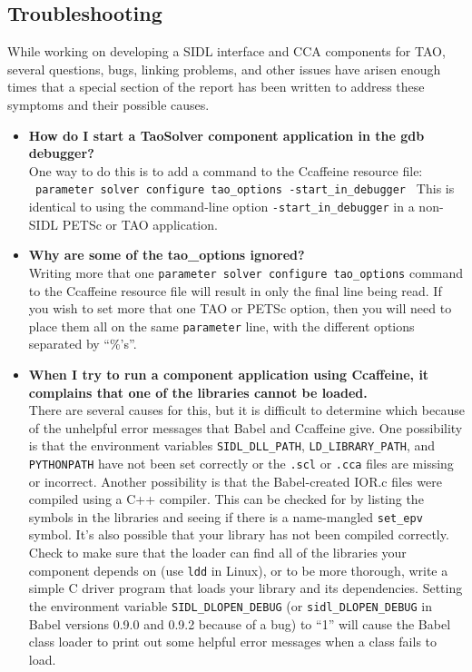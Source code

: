 \documentclass[doublespacing,12pt]{article}
\begin{document}
\subsection{Troubleshooting}
While working on developing a SIDL interface and CCA components for
TAO, several questions, bugs, linking problems, and other issues have arisen
enough times that a special section of the report has been written to
address these symptoms and their possible causes.
\begin{itemize}
\item \textbf{How do I start a TaoSolver component application in the
  gdb debugger?}\\
One way to do this is to add a command to the Ccaffeine resource file:\\
\texttt{
parameter solver configure tao\_options -start\_in\_debugger
}
This is identical to using the command-line option
\texttt{-start\_in\_debugger} in a non-SIDL PETSc or TAO application.

\item \textbf{Why are some of the tao\_options ignored?}\\
Writing more that one \texttt{parameter solver configure tao\_options}
command to the Ccaffeine resource file will result in only the final
line being read.  If you wish to set more that one TAO or PETSc
option, then you will need to place them all on the same
\texttt{parameter} line, with the different options separated by ``\%'s''.

\item \textbf{When I try to run a component application using
  Ccaffeine, it complains that one of the libraries cannot be loaded.}\\
There are several causes for this, but it is difficult to determine
which because of the unhelpful error messages that Babel and Ccaffeine
give. One possibility is that the environment
variables \texttt{SIDL\_DLL\_PATH}, \texttt{LD\_LIBRARY\_PATH},
  and \texttt{PYTHONPATH} have not been set correctly or the
  \texttt{.scl} or \texttt{.cca} files are missing or incorrect.
Another possibility is that the
  Babel-created IOR.c files were compiled using a C++ compiler.  This
  can be checked for by listing the symbols in the libraries and
  seeing if there is a name-mangled \texttt{set\_epv} symbol.
It's also possible that your library has not been compiled correctly.
  Check to make sure that the loader can find all of the libraries
  your component depends on (use \texttt{ldd} in Linux), or to be more
  thorough, write
  a simple C driver program that loads your library and its
  dependencies.  Setting the environment variable
  \texttt{SIDL\_DLOPEN\_DEBUG} (or \texttt{sidl\_DLOPEN\_DEBUG} in
  Babel versions 0.9.0 and 0.9.2 because of a bug) to ``1'' will
  cause the Babel class loader to print out some helpful error
  messages when a class fails to load.
\end{itemize}
\end{document}
